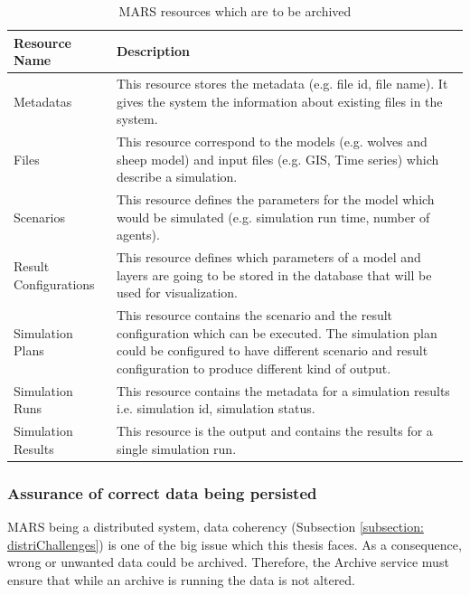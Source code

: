         \begin{table}[H]
            \centering
            \begin{tabular}{|p{3cm}|p{12cm}|}
                \hline
                    \textbf{Resource Name}  & \textbf{Description}\\
                \hline
                     Metadatas & 
                     This resource stores the metadata (e.g. file id, file name). It gives the system the information about
                     existing files in the system. \\
                \hline
                     Files & 
                     This resource correspond to the models (e.g. wolves and sheep model) and input files (e.g. GIS, Time series) which describe a simulation. \\
                \hline
                     Scenarios & 
                     This resource defines the parameters for the model which would be simulated (e.g. simulation run time, number of agents). \\
                \hline
                     Result Configurations & 
                     This resource defines which parameters of a model and layers are going to be stored in the database that will be used for visualization.\\
                \hline
                     Simulation Plans & 
                     This resource contains the scenario and the result configuration which can be executed. The simulation plan could be configured to
                     have different scenario and result configuration to produce different kind of output.\\
                \hline
                     Simulation Runs & 
                     This resource contains the metadata for a simulation results i.e. simulation id, simulation status.\\
                \hline
                     Simulation Results & 
                     This resource is the output and contains the results for a single simulation run.\\
                \hline
            \end{tabular}
            \caption{MARS resources which are to be archived}
            \label{table: archivedMars}     
        \end{table} 
        
        \subsubsection{Assurance of correct data being persisted}
            MARS being a distributed system, data coherency (Subsection \ref{subsection: distriChallenges}) 
            is one of the big issue which this thesis faces. As a consequence,
            wrong or unwanted data could be archived. Therefore, the Archive service must ensure that while an archive is running the data is not
            altered.
        
